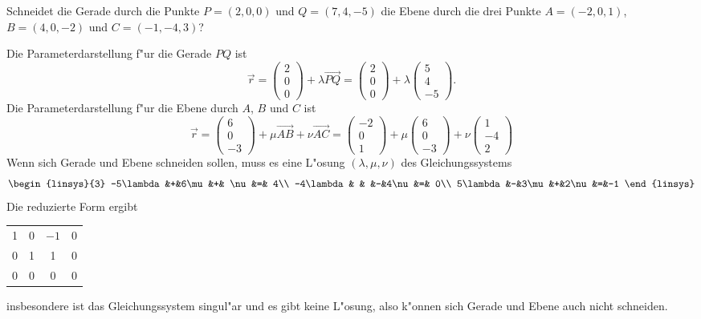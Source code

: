 Schneidet die Gerade durch die Punkte $P=(2,0,0)$ und $Q=(7,4,-5)$
die Ebene durch
die drei Punkte $A=(-2,0,1)$, $B=(4,0,-2)$ und $C=(-1,-4,3)$?

\begin{loesung}
Die Parameterdarstellung f"ur die Gerade $PQ$ ist
\[
\vec r=
\begin{pmatrix} 2\\0\\0 \end{pmatrix}
+\lambda \overrightarrow{PQ}
=
\begin{pmatrix} 2\\0\\0 \end{pmatrix}
+\lambda
\begin{pmatrix}  5\\4\\-5\end{pmatrix}.
\]
Die Parameterdarstellung f"ur die Ebene durch $A$, $B$ und $C$ ist
\[
\vec r
=
\begin{pmatrix}6\\0\\-3\end{pmatrix}
+\mu \overrightarrow{AB}
+\nu \overrightarrow{AC}
=
\begin{pmatrix}-2\\0\\1\end{pmatrix}
+\mu \begin{pmatrix}6\\0\\-3\end{pmatrix}
+\nu \begin{pmatrix}1\\-4\\2\end{pmatrix}
\]
Wenn sich Gerade und Ebene schneiden sollen, muss es eine L"osung
$(\lambda,\mu,\nu)$ des Gleichungssystems
\[
\begin{linsys}{3}
-5\lambda&+&6\mu&+& \nu&=& 4\\
-4\lambda& &    &-&4\nu&=& 0\\
5\lambda&-&3\mu&+&2\nu&=&-1
\end{linsys}
\]
Die reduzierte Form ergibt
\begin{center}
\begin{tabular}{|ccc|c|}
\hline
1&0&$-1$&0\\
0&1& 1&0\\
0&0& 0&0\\
\hline
\end{tabular}
\end{center}
insbesondere ist das Gleichungssystem singul"ar und es gibt keine
L"osung, also k"onnen sich Gerade und Ebene auch nicht schneiden.


\end{loesung}
